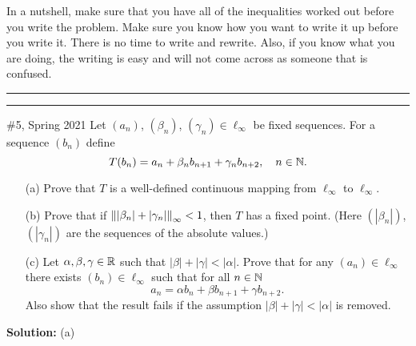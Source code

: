 \documentclass{article}
\begin{document}
In a nutshell, make sure that you have all of the inequalities worked out before you write the problem. Make sure you know how you want to write it up before you write it. There is no time to write and rewrite. Also, if you know what you are doing, the writing is easy and will not come across as someone that is confused.\\

\hrule \vspace{2pt}
\hrule 

\break

\begin{problem}{\#5, Spring 2021} Let $(a_n)$, $(\beta_n)$, $(\gamma_n)\in \ell_\infty$ be fixed sequences. For a sequence $(b_n)$ define 
	\[ T(b_n) = a_n + \beta_n b_{n+1} + \gamma_n b_{n+2}, \quad n\in \mathbb N.\]
\begin{enumerate}
	\item[(a)] Prove that $T$ is a well-defined continuous mapping from $\ell_\infty$ to $\ell_\infty$.
	\item[(b)] Prove that if $\left\lVert {|\beta_n| + |\gamma_n|} \right\rVert_\infty < 1$, then $T$ has a fixed point. (Here $(|\beta_n|)$, 
			$(|\gamma_n|)$ are the sequences of the absolute values.)
	\item[(c)] Let $\alpha, \beta, \gamma\in\mathbb R$ such that $|\beta| + |\gamma| < |\alpha|$. Prove that for any $(a_n)\in \ell_\infty$
			there exists $(b_n)\in\ell_\infty$ such that for all $n\in \mathbb N$
				\[a_n = \alpha b_n + \beta b_{n+1} + \gamma b_{n+2}.\]
			Also show that the result fails if the assumption $|\beta| + |\gamma| < |\alpha|$ is removed. 
\end{enumerate}
\end{problem}

\textbf{Solution:} (a) 
\end{document}
